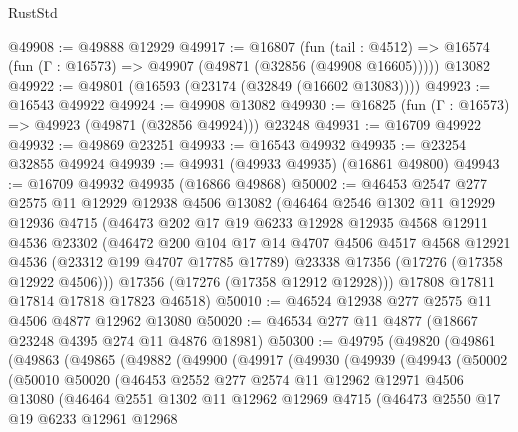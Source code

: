 \begin{lexlean}{RustStd}
\begin{coremodule}
@49908 := @49888 @12929
@49917 := @16807
    (fun (tail : @4512) => @16574 (fun (Γ : @16573) => @49907 (@49871 (@32856 (@49908 @16605)))))
    @13082
@49922 := @49801 (@16593 (@23174 (@32849 (@16602 @13083))))
@49923 := @16543 @49922
@49924 := @49908 @13082
@49930 := @16825 (fun (Γ : @16573) => @49923 (@49871 (@32856 @49924))) @23248
@49931 := @16709 @49922
@49932 := @49869 @23251
@49933 := @16543 @49932
@49935 := @23254 @32855 @49924
@49939 := @49931 (@49933 @49935) (@16861 @49800)
@49943 := @16709 @49932 @49935 (@16866 @49868)
@50002 := @46453
    @2547
    @277
    @2575
    @11
    @12929
    @12938
    @4506
    @13082
    (@46464
      @2546
      @1302
      @11
      @12929
      @12936
      @4715
      (@46473
        @202
        @17
        @19
        @6233
        @12928
        @12935
        @4568
        @12911
        @4536
        @23302
        (@46472
          @200
          @104
          @17
          @14
          @4707
          @4506
          @4517
          @4568
          @12921
          @4536
          (@23312 @199 @4707 @17785 @17789)
          @23338
          @17356
          (@17276 (@17358 @12922 @4506)))
        @17356
        (@17276 (@17358 @12912 @12928)))
      @17808
      @17811
      @17814
      @17818
      @17823
      @46518)
@50010 := @46524 @12938 @277 @2575 @11 @4506 @4877 @12962 @13080
@50020 := @46534 @277 @11 @4877 (@18667 @23248 @4395 @274 @11 @4876 @18981)
@50300 := @49795
    (@49820
      (@49861
        (@49863
          (@49865
            (@49882
              (@49900
                (@49917
                  (@49930
                    (@49939
                      (@49943
                        (@50002
                          (@50010
                            @50020
                            (@46453
                              @2552
                              @277
                              @2574
                              @11
                              @12962
                              @12971
                              @4506
                              @13080
                              (@46464
                                @2551
                                @1302
                                @11
                                @12962
                                @12969
                                @4715
                                (@46473
                                  @2550
                                  @17
                                  @19
                                  @6233
                                  @12961
                                  @12968

\end{coremodule}
\end{lexlean}
